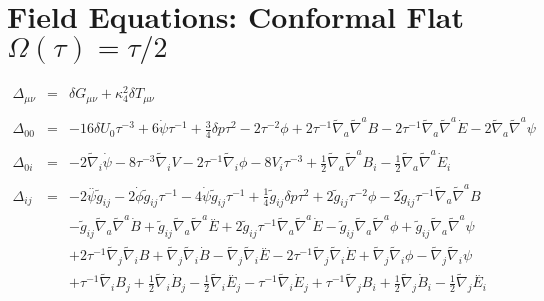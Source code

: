 \documentclass[10pt,letterpaper]{article}
\numberwithin{equation}{section}
\begin{document}
\section{Field Equations: Conformal Flat $\Omega(\tau)=\tau/2$}
%
\begin{eqnarray}
\Delta_{\mu\nu} &=& \delta G_{\mu\nu} + \kappa^2_4 \delta T_{\mu\nu}
\\ \nonumber\\
\Delta_{00} &=&-16 \delta U_{0}{} \tau^{-3} + 6 \dot{\psi} \tau^{-1} + \tfrac{3}{4} \delta p \tau^2 - 2 \tau^{-2} \phi + 2 \tau^{-1} \tilde{\nabla}_{a}\tilde{\nabla}^{a}B - 2 \tau^{-1} \tilde{\nabla}_{a}\tilde{\nabla}^{a}\dot{E} - 2 \tilde{\nabla}_{a}\tilde{\nabla}^{a}\psi 
\\ \nonumber\\
\Delta_{0i} &=& -2 \tilde{\nabla}_{i}\dot{\psi} - 8 \tau^{-3} \tilde{\nabla}_{i}V - 2 \tau^{-1} \tilde{\nabla}_{i}\phi 
-8 V_{i} \tau^{-3} + \tfrac{1}{2} \tilde{\nabla}_{a}\tilde{\nabla}^{a}B_{i} -  \tfrac{1}{2} \tilde{\nabla}_{a}\tilde{\nabla}^{a}\dot{E}_{i}
\\ \nonumber\\
\Delta_{ij} &=& 
-2 \overset{..}{\psi} \tilde{g}_{ij}
- 2 \dot{\phi} \tilde{g}_{ij} \tau^{-1}
- 4 \dot{\psi} \tilde{g}_{ij} \tau^{-1}
+ \tfrac{1}{4} \tilde{g}_{ij} \delta p \tau^2
+ 2 \tilde{g}_{ij} \tau^{-2} \phi
- 2 \tilde{g}_{ij} \tau^{-1} \tilde{\nabla}_{a}\tilde{\nabla}^{a}B\nonumber\\
&& -  \tilde{g}_{ij} \tilde{\nabla}_{a}\tilde{\nabla}^{a}\dot{B}
+ \tilde{g}_{ij} \tilde{\nabla}_{a}\tilde{\nabla}^{a}\overset{..}{E}
+ 2 \tilde{g}_{ij} \tau^{-1} \tilde{\nabla}_{a}\tilde{\nabla}^{a}\dot{E}
-  \tilde{g}_{ij} \tilde{\nabla}_{a}\tilde{\nabla}^{a}\phi
+ \tilde{g}_{ij} \tilde{\nabla}_{a}\tilde{\nabla}^{a}\psi\nonumber\\
&& + 2 \tau^{-1} \tilde{\nabla}_{j}\tilde{\nabla}_{i}B
+ \tilde{\nabla}_{j}\tilde{\nabla}_{i}\dot{B}
-  \tilde{\nabla}_{j}\tilde{\nabla}_{i}\overset{..}{E}
- 2 \tau^{-1} \tilde{\nabla}_{j}\tilde{\nabla}_{i}\dot{E}
+ \tilde{\nabla}_{j}\tilde{\nabla}_{i}\phi
-  \tilde{\nabla}_{j}\tilde{\nabla}_{i}\psi 
\nonumber\\
&& +\tau^{-1} \tilde{\nabla}_{i}B_{j}
+ \tfrac{1}{2} \tilde{\nabla}_{i}\dot{B}_{j}
-  \tfrac{1}{2} \tilde{\nabla}_{i}\overset{..}{E}_{j}
-  \tau^{-1} \tilde{\nabla}_{i}\dot{E}_{j}
+ \tau^{-1} \tilde{\nabla}_{j}B_{i}
+ \tfrac{1}{2} \tilde{\nabla}_{j}\dot{B}_{i}
-  \tfrac{1}{2} \tilde{\nabla}_{j}\overset{..}{E}_{i}

\end{eqnarray}
\end{document}
